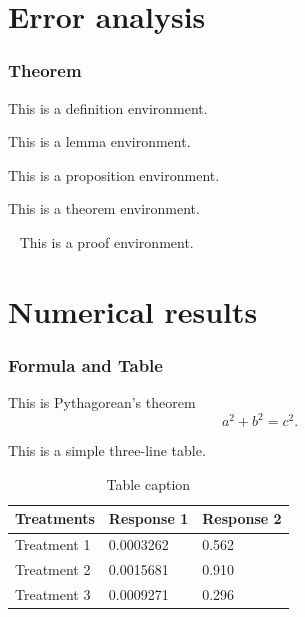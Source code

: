 \documentclass[noamsthm,notheorems,11pt,compress]{beamer}
\theoremstyle{numberplain} %
\newenvironment{proof}[1][]{\noindent{\sffamily\color{structure.fg}{Proof.}}~\rmfamily #1}{\medskip}
\numberwithin{figure}{section}
\numberwithin{table}{section}
\numberwithin{equation}{section}
\begin{document}
\section{Error analysis}

\begin{frame}
\frametitle{Theorem}

\begin{definition}
This is a definition environment.
\end{definition}

\begin{lemma}
This is a lemma environment.
\end{lemma}

\begin{proposition}
This is a proposition environment.
\end{proposition}

\begin{theorem}
This is a theorem environment.
\end{theorem}

\begin{proof}
  This is a proof environment.
\end{proof}

\end{frame}


\section{Numerical results}  %


\begin{frame}
\frametitle{Formula and Table}

This is Pythagorean's theorem
\begin{equation}\label{Pythagorean}
  a^2+b^2=c^2.
\end{equation}

This is a simple three-line table.
\begin{table}
\caption{Table caption}
\begin{tabular}{l l l}
\toprule
Treatments & Response 1 & Response 2 \\
\midrule
Treatment 1 & 0.0003262 & 0.562 \\
Treatment 2 & 0.0015681 & 0.910 \\
Treatment 3 & 0.0009271 & 0.296 \\
\bottomrule
\end{tabular}
\end{table}

\end{frame}
\end{document}
